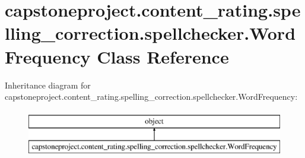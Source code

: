 \hypertarget{classcapstoneproject_1_1content__rating_1_1spelling__correction_1_1spellchecker_1_1_word_frequency}{}\section{capstoneproject.\+content\+\_\+rating.\+spelling\+\_\+correction.\+spellchecker.\+Word\+Frequency Class Reference}
\label{classcapstoneproject_1_1content__rating_1_1spelling__correction_1_1spellchecker_1_1_word_frequency}
Inheritance diagram for capstoneproject.\+content\+\_\+rating.\+spelling\+\_\+correction.\+spellchecker.\+Word\+Frequency\+:\begin{figure}[H]
\begin{center}
\leavevmode
\includegraphics[height=2.000000cm]{classcapstoneproject_1_1content__rating_1_1spelling__correction_1_1spellchecker_1_1_word_frequency}
\end{center}
\end{figure}
